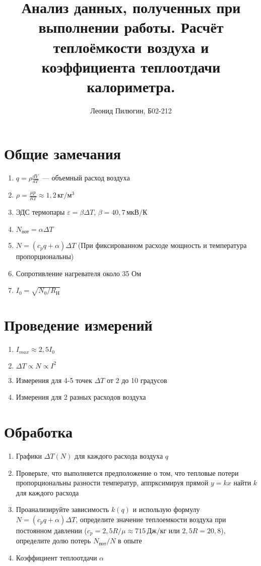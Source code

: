 \documentclass[a4paper, 12pt]{article}
\title{Анализ данных, полученных при выполнении работы. Расчёт теплоёмкости воздуха и коэффициента теплоотдачи калориметра.}
\author{Леонид Пилюгин, Б02-212}
\begin{document}
    \maketitle
    \section{Общие замечания}
    \begin{enumerate}
        \item $q=\rho\frac{dV}{dT}$~--- объемный расход воздуха
        \item $\rho=\frac{\mu p}{RT}\approx 1{,}2\,\text{кг}/\text{м}^3$
        \item ЭДС термопары $\varepsilon=\beta\Delta T$, $\beta=40{,}7\,\text{мкВ}/\text{К}$
        \item $N_\text{пот}=\alpha\Delta T$
        \item $N=(c_pq+\alpha)\Delta T$ (При фиксированном расходе мощность и температура пропорциональны)
        \item Сопротивление нагревателя около 35 Ом
        \item $I_0=\sqrt{N_0/R_\text{Н}}$
    \end{enumerate}
    \section{Проведение измерений}
    \begin{enumerate}
        \item $I_{max}\approx2{,}5 I_0$
        \item $\Delta T \propto N \propto  I^2$
        \item Измерения для 4-5 точек $\Delta T$ от 2 до 10 градусов
        \item Измерения для 2 разных расходов воздуха
    \end{enumerate}
    \section{Обработка}
    \begin{enumerate}
        \item Графики $\Delta T(N)$ для каждого расхода воздуха $q$
        \item Проверьте, что выполняется предположение о том, что
        тепловые потери пропорциональны разности температур,
        аппрксимируя прямой $y=kx$ найти $k$ для каждого расхода
        \item Проанализируйте зависимость $k(q)$ и использую формулу
        $N=(c_pq+\alpha)\Delta T$, определите значение теплоемкости
        воздуха при постоянном давлении ($c_p=2{,}5R/\mu\approx715\,\text{Дж}/\text{кг}$ или $2{,}5R=20{,}8$),
        определите долю потерь $N_\text{пот}/N$ в опыте
        \item Коэффициент теплоотдачи $\alpha$
    \end{enumerate}
\end{document}
